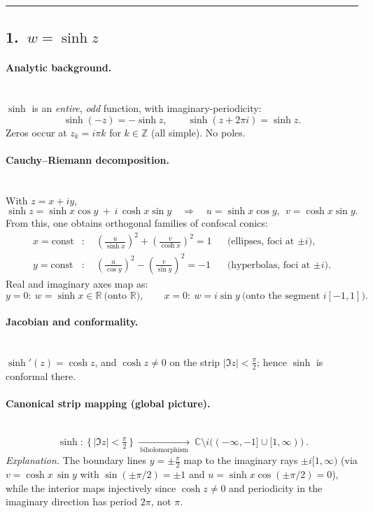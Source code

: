 \documentclass[11pt]{article}
\begin{document}
\bigskip\hrule\bigskip

\subsection*{1.\ $w=\sinh z$}

\paragraph{Analytic background.}\mbox{}\\[2pt]
$\sinh$ is an \emph{entire}, \emph{odd} function, with imaginary-periodicity:
\[
\sinh(-z)=-\sinh z,\qquad \sinh(z+2\pi i)=\sinh z.
\]
Zeros occur at $z_k=i\pi k$ for $k\in\mathbb Z$ (all simple). No poles.

\medskip

\paragraph{Cauchy--Riemann decomposition.}\mbox{}\\[2pt]
With $z=x+iy$,
\[
\sinh z=\sinh x\cos y\ +\ i\,\cosh x\sin y \quad\Rightarrow\quad
u=\sinh x\cos y,\ \ v=\cosh x\sin y.
\]
From this, one obtains orthogonal families of confocal conics:
\begin{align*}
	x=\text{const}&:\quad \left(\frac{u}{\sinh x}\right)^{2}+\left(\frac{v}{\cosh x}\right)^{2}=1
	&&\text{(ellipses, foci at $\pm i$)},\\[2pt]
	y=\text{const}&:\quad \left(\frac{u}{\cos y}\right)^{2}-\left(\frac{v}{\sin y}\right)^{2}=-1
	&&\text{(hyperbolas, foci at $\pm i$)}.
\end{align*}
Real and imaginary axes map as:
\[
y=0:\ w=\sinh x\in\mathbb R\ \text{(onto $\mathbb R$)},\qquad
x=0:\ w=i\sin y\ \text{(onto the segment $i[-1,1]$)}.
\]

\medskip

\paragraph{Jacobian and conformality.}\mbox{}\\[2pt]
$\sinh'(z)=\cosh z$, and $\cosh z\neq 0$ on the strip $|\Im z|<\tfrac{\pi}{2}$; hence $\sinh$ is conformal there.

\medskip

\paragraph{Canonical strip mapping (global picture).}\mbox{}\\[2pt]
\[
\boxed{\
	\sinh:\ \{\,|\Im z|<\tfrac{\pi}{2}\,\}\ \xrightarrow[\ \text{biholomorphism}\ ]{}\ 
	\mathbb C\setminus i\big((-\infty,-1]\cup[1,\infty)\big)\ .
}
\]
\emph{Explanation.} The boundary lines $y=\pm\frac{\pi}{2}$ map to the imaginary rays $\pm i[1,\infty)$
(via $v=\cosh x\,\sin y$ with $\sin(\pm\pi/2)=\pm1$ and $u=\sinh x\cos(\pm\pi/2)=0$), while the interior maps injectively since $\cosh z\neq0$ and periodicity in the imaginary direction has period $2\pi$, not $\pi$.
\end{document}
